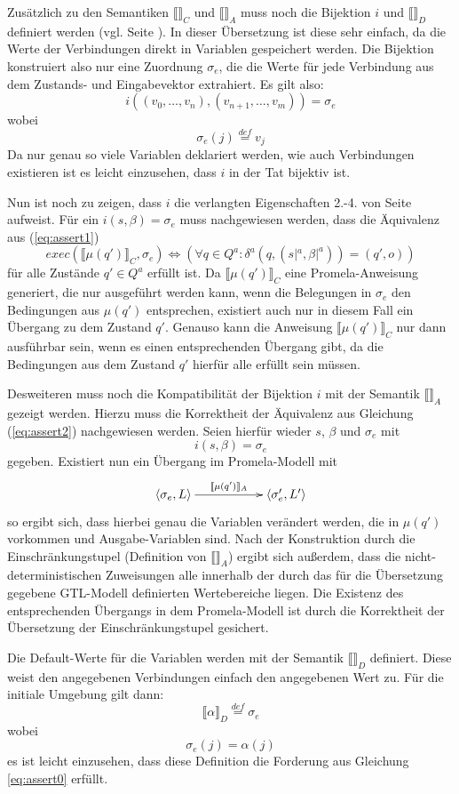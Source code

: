 Zusätzlich zu den Semantiken $\llbracket\rrbracket_C$ und $\llbracket\rrbracket_A$ muss noch die Bijektion $i$ und $\llbracket\rrbracket_D$ definiert werden (vgl. Seite \pageref{sec:translation-correctness}).
In dieser Übersetzung ist diese sehr einfach, da die Werte der Verbindungen direkt in Variablen gespeichert werden.
Die Bijektion konstruiert also nur eine Zuordnung $\sigma_e$, die die Werte für jede Verbindung aus dem Zustands- und Eingabevektor extrahiert.
Es gilt also:
\[ i((v_0,\dots,v_n),(v_{n+1},\dots,v_m)) = \sigma_e \]
wobei
\[ \sigma_e(j) \overset{def}{=} v_j \]
Da nur genau so viele Variablen deklariert werden, wie auch Verbindungen existieren ist es leicht einzusehen, dass $i$ in der Tat bijektiv ist.

Nun ist noch zu zeigen, dass $i$ die verlangten Eigenschaften 2.-4. von Seite \pageref{sec:bijection_conditions} aufweist.
Für ein $i(s,\beta)=\sigma_e$ muss nachgewiesen werden, dass die Äquivalenz aus (\ref{eq:assert1})
\[ \mathit{exec}(\llbracket \mu(q')\rrbracket_C,\sigma_e)\Leftrightarrow (\forall q\in Q^a: \delta^a(q,(s|^a,\beta|^a)) = (q',o)) \]
für alle Zustände $q'\in Q^a$ erfüllt ist.
Da $\llbracket\mu(q')\rrbracket_C$ eine Promela-Anweisung generiert, die nur ausgeführt werden kann, wenn die Belegungen in $\sigma_e$ den Bedingungen aus $\mu(q')$ entsprechen, existiert auch nur in diesem Fall ein Übergang zu dem Zustand $q'$.
Genauso kann die Anweisung $\llbracket\mu(q')\rrbracket_C$ nur dann ausführbar sein, wenn es einen entsprechenden Übergang gibt, da die Bedingungen aus dem Zustand $q'$ hierfür alle erfüllt sein müssen.

Desweiteren muss noch die Kompatibilität der Bijektion $i$ mit der Semantik $\llbracket\rrbracket_A$ gezeigt werden.
Hierzu muss die Korrektheit der Äquivalenz aus Gleichung (\ref{eq:assert2}) nachgewiesen werden.
Seien hierfür wieder $s$, $\beta$ und $\sigma_e$ mit 
\[ i(s,\beta) = \sigma_e \]
gegeben.
Existiert nun ein Übergang im Promela-Modell mit
\[ \xymatrix{ \left<\sigma_e,L\right> \ar[rr]^-{\llbracket \mu(q')\rrbracket_A} & & \left<\sigma_e',L'\right> } \]
so ergibt sich, dass hierbei genau die Variablen verändert werden, die in $\mu(q')$ vorkommen und Ausgabe-Variablen sind.
Nach der Konstruktion durch die Einschränkungstupel (Definition von $\llbracket\rrbracket_A$) ergibt sich außerdem, dass die nicht-deterministischen Zuweisungen alle innerhalb der durch das für die Übersetzung gegebene GTL-Modell definierten Wertebereiche liegen.
Die Existenz des entsprechenden Übergangs in dem Promela-Modell ist durch die Korrektheit der Übersetzung der Einschränkungstupel gesichert.

Die Default-Werte für die Variablen werden mit der Semantik $\llbracket\rrbracket_D$ definiert.
Diese weist den angegebenen Verbindungen einfach den angegebenen Wert zu.
Für die initiale Umgebung gilt dann:
\[ \llbracket \alpha\rrbracket_D \overset{def}{=} \sigma_e \]
wobei
\[ \sigma_e(j) = \alpha(j) \]
es ist leicht einzusehen, dass diese Definition die Forderung aus Gleichung \ref{eq:assert0} erfüllt.